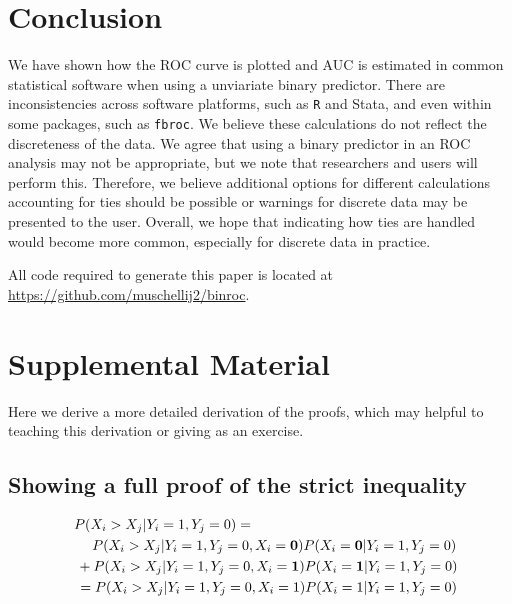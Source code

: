 \documentclass[article]{jss}
\begin{document}
\hypertarget{conclusion}{%
\section{Conclusion}\label{conclusion}}

We have shown how the ROC curve is plotted and AUC is estimated in
common statistical software when using a unviariate binary predictor.
There are inconsistencies across software platforms, such as \texttt{R}
and Stata, and even within some packages, such as \texttt{fbroc}. We
believe these calculations do not reflect the discreteness of the data.
We agree that using a binary predictor in an ROC analysis may not be
appropriate, but we note that researchers and users will perform this.
Therefore, we believe additional options for different calculations
accounting for ties should be possible or warnings for discrete data may
be presented to the user. Overall, we hope that indicating how ties are
handled would become more common, especially for discrete data in
practice.

All code required to generate this paper is located at
\url{https://github.com/muschellij2/binroc}.

\hypertarget{supplemental-material}{%
\section{Supplemental Material}\label{supplemental-material}}

Here we derive a more detailed derivation of the proofs, which may
helpful to teaching this derivation or giving as an exercise.

\hypertarget{showing-a-full-proof-of-the-strict-inequality}{%
\subsection{Showing a full proof of the strict
inequality}\label{showing-a-full-proof-of-the-strict-inequality}}

\begin{align}
& P(X_{i} > X_{j} | Y_{i} = 1, Y_{j} = 0) = \;\;\;\; \nonumber \\ 
\;\;\; & \hspace{1.3em}P(X_{i} > X_{j} | Y_{i} = 1, Y_{j} = 0, X_{i} = {\bf 0}) P(X_{i} = {\bf 0} | Y_{i} = 1, Y_{j} = 0) \nonumber \\
\;\;\; &\,+ P(X_{i} > X_{j} | Y_{i} = 1, Y_{j} = 0, X_{i} = {\bf 1}) P(X_{i} = {\bf 1} | Y_{i} = 1, Y_{j} = 0) \nonumber \\
\;\;\; &\,= P(X_{i} > X_{j} | Y_{i} = 1, Y_{j} = 0, X_{i} = 1) P(X_{i} = 1 | Y_{i} = 1, Y_{j} = 0) \label{eq:expand_supp}
\end{align}
\end{document}
